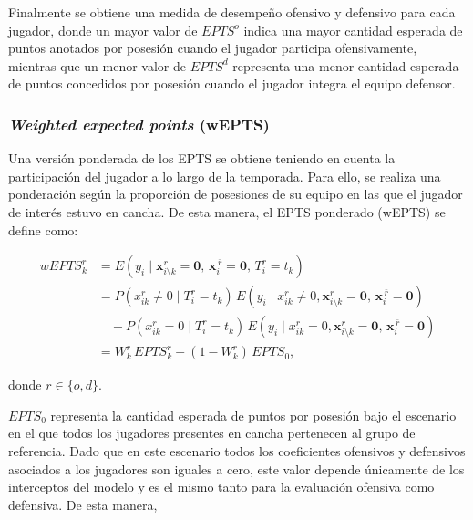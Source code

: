 \documentclass[
  12pt,
]{article}
\begin{document}
Finalmente se obtiene una medida de desempeño ofensivo y defensivo para
cada jugador, donde un mayor valor de \(EPTS^o\) indica una mayor
cantidad esperada de puntos anotados por posesión cuando el jugador
participa ofensivamente, mientras que un menor valor de \(EPTS^d\)
representa una menor cantidad esperada de puntos concedidos por posesión
cuando el jugador integra el equipo defensor.

\subsubsection{\texorpdfstring{\emph{Weighted expected points}
(wEPTS)}{Weighted expected points (wEPTS)}}\label{weighted-expected-points-wepts}

Una versión ponderada de los EPTS se obtiene teniendo en cuenta la
participación del jugador a lo largo de la temporada. Para ello, se
realiza una ponderación según la proporción de posesiones de su equipo
en las que el jugador de interés estuvo en cancha. De esta manera, el
EPTS ponderado (wEPTS) se define como:

\begin{equation}
\begin{aligned}
wEPTS_k^{r} &= E(y_i \mid \boldsymbol{x}_{i\setminus{k}}^{r} = \boldsymbol{0},\, \boldsymbol{x}_i^{\,\bar{r}} = \boldsymbol{0},\, T_i^{r} = t_k) \\[6pt]
&= P(x_{ik}^{r} \ne 0 \mid T_i^{r} = t_k) \, E(y_i \mid x_{ik}^{r} \ne 0,\boldsymbol{x}_{i\setminus{k}}^{r} = \boldsymbol{0},\, \boldsymbol{x}_i^{\,\bar{r}} = \boldsymbol{0}) \\[6pt]
&\quad + P(x_{ik}^{r} = 0 \mid T_i^{r} = t_k) \, E(y_i \mid x_{ik}^{r} = 0,\boldsymbol{x}_{i\setminus{k}}^{r} = \boldsymbol{0},\, \boldsymbol{x}_i^{\,\bar{r}} = \boldsymbol{0}) \\[6pt]
&= W_k^{r} \, EPTS_k^{r} + (1 - W_k^{r}) \, EPTS_0,
\end{aligned}
\end{equation}

donde \(r \in \{o, d\}\).

\(EPTS_0\) representa la cantidad esperada de puntos por posesión bajo
el escenario en el que todos los jugadores presentes en cancha
pertenecen al grupo de referencia. Dado que en este escenario todos los
coeficientes ofensivos y defensivos asociados a los jugadores son
iguales a cero, este valor depende únicamente de los interceptos del
modelo y es el mismo tanto para la evaluación ofensiva como defensiva.
De esta manera,
\end{document}
